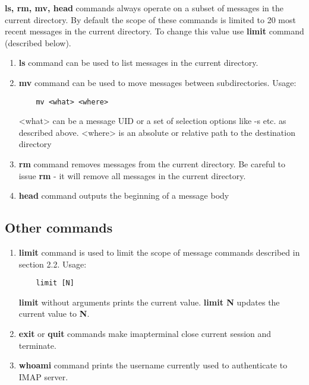 \documentclass[titlepage]{article}
\begin{document}
\par
\textbf{ls, rm, mv, head} commands always operate on a subset of messages in the current 
directory. By default the scope of these commands is limited to 20 most recent messages
in the current directory. To change this value use \textbf{limit} command (described below).

\begin{enumerate}
	\item
	\textbf{ls} command can be used to list messages in the current directory.
		
	\item
	\textbf{mv} command can be used to move messages between subdirectories. Usage:
	\begin{lstlisting}
	mv <what> <where>
	\end{lstlisting}
	<what> can be a message UID or a set of selection options like -s etc. as described above.
	<where> is an absolute or relative path to the destination directory 
	
	\item
	\textbf{rm} command removes messages from the current directory. Be careful to issue 
	\textbf{rm} - it will remove all messages in the current directory.
	
	\item
	\textbf{head} command outputs the beginning of a message body
\end{enumerate}

\subsection{Other commands}
\begin{enumerate}
	\item
	\textbf{limit} command is used to limit the scope of message commands described in section 2.2.
	Usage:
	\begin{lstlisting}
	limit [N]
	\end{lstlisting}
	\textbf{limit} without arguments prints the current value. \textbf{limit N} updates the current
	value to \textbf{N}.
	
	\item
	\textbf{exit} or \textbf{quit} commands make imap\textunderscore terminal close current
	session and terminate.
	
	\item
	\textbf{whoami} command prints the username currently used to authenticate to IMAP server.
\end{enumerate}
\end{document}
